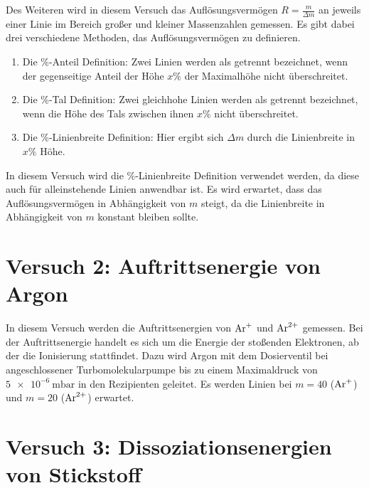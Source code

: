 Des Weiteren wird in diesem Versuch das Auflösungsvermögen $R=\frac{m}{\Delta m}$ an jeweils einer Linie im Bereich großer und kleiner Massenzahlen gemessen. Es gibt dabei drei verschiedene Methoden, das Auflösungsvermögen zu definieren.
\begin{enumerate}
 \item Die \%-Anteil Definition: Zwei Linien werden als getrennt bezeichnet, wenn der gegenseitige Anteil der Höhe $x\%$ der Maximalhöhe nicht überschreitet.
 \item Die \%-Tal Definition: Zwei gleichhohe Linien werden als getrennt bezeichnet, wenn die Höhe des Tals zwischen ihnen $x\%$ nicht überschreitet.
 \item Die \%-Linienbreite Definition: Hier ergibt sich $\Delta m$ durch die Linienbreite in $x\%$ Höhe.
\end{enumerate}
In diesem Versuch wird die \%-Linienbreite Definition verwendet werden, da diese auch für alleinstehende Linien anwendbar ist. Es wird erwartet, dass das Auflösungsvermögen in Abhängigkeit von $m$ steigt, da die Linienbreite in Abhängigkeit von $m$ konstant bleiben sollte.

\section{Versuch 2: Auftrittsenergie von Argon}

In diesem Versuch werden die Auftrittsenergien von $\rm{Ar}^{+}$ und $\rm{Ar}^{2+}$ gemessen. Bei der Auftrittsenergie handelt es sich um die Energie der stoßenden Elektronen, ab der die Ionisierung stattfindet.
Dazu wird Argon mit dem Dosierventil bei angeschlossener Turbomolekularpumpe bis zu einem Maximaldruck von $\SI{5e-6}{\milli\bar}$ in den Rezipienten geleitet. Es werden Linien bei $m=40$ ($\rm{Ar}^{+}$) und $m=20$ ($\rm{Ar}^{2+}$) erwartet.

\section{Versuch 3: Dissoziationsenergien von Stickstoff}

